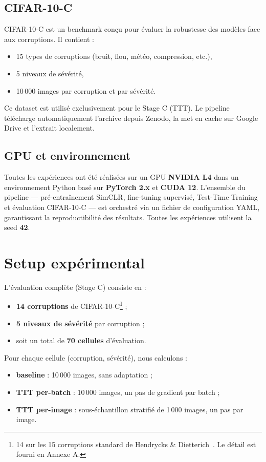 \documentclass[12pt,a4paper]{report}
\begin{document}
	\subsection{CIFAR-10-C}
	CIFAR-10-C est un benchmark conçu pour évaluer la robustesse des modèles face aux corruptions. Il contient :
	\begin{itemize}
		\item 15 types de corruptions (bruit, flou, météo, compression, etc.),
		\item 5 niveaux de sévérité,
		\item 10\,000 images par corruption et par sévérité.
	\end{itemize}
	
	Ce dataset est utilisé exclusivement pour le Stage C (TTT). Le pipeline télécharge automatiquement l’archive depuis Zenodo, la met en cache sur Google Drive et l’extrait localement.
	
	\subsection{GPU et environnement}
	Toutes les expériences ont été réalisées sur un GPU \textbf{NVIDIA L4} dans un environnement Python basé sur \textbf{PyTorch 2.x} et \textbf{CUDA 12}. 
	L’ensemble du pipeline — pré-entraînement SimCLR, fine-tuning supervisé, Test-Time Training et évaluation CIFAR-10-C — est orchestré via un fichier de configuration YAML, garantissant la reproductibilité des résultats. 
	Toutes les expériences utilisent la seed \textbf{42}.
	
	\section{Setup expérimental}
	L’évaluation complète (Stage C) consiste en :
	\begin{itemize}
		\item \textbf{14 corruptions} de CIFAR-10-C\footnote{14 sur les 15 corruptions standard de Hendrycks \& Dietterich~\cite{Hendrycks2019}. Le détail est fourni en Annexe A.} ;
		\item \textbf{5 niveaux de sévérité} par corruption ;
		\item soit un total de \textbf{70 cellules} d’évaluation.
	\end{itemize}
	
	Pour chaque cellule (corruption, sévérité), nous calculons :
	\begin{itemize}
		\item \textbf{baseline} : 10\,000 images, sans adaptation ;
		\item \textbf{TTT per-batch} : 10\,000 images, un pas de gradient par batch ;
		\item \textbf{TTT per-image} : sous-échantillon stratifié de 1\,000 images, un pas par image.
	\end{itemize}
	
\end{document}
